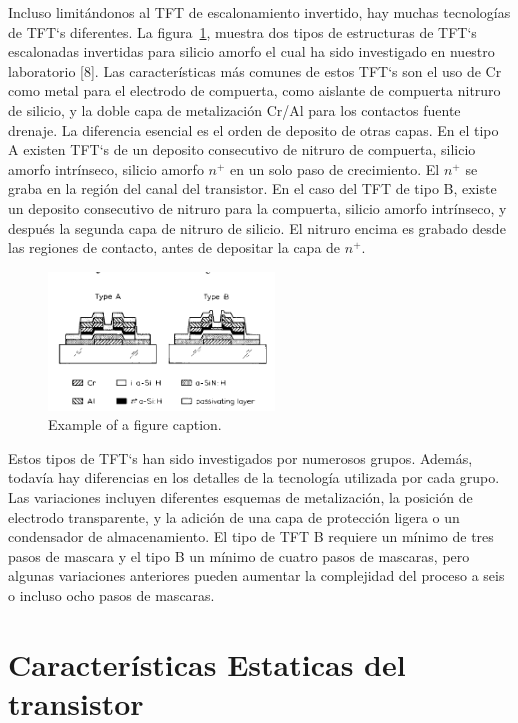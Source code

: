 \documentclass[conference]{IEEEtran}
\begin{document}
    Incluso limitándonos al TFT de escalonamiento invertido, hay muchas tecnologías 
    de TFT`s diferentes. La figura~\ref{fig2}, muestra dos tipos de estructuras de TFT`s
    escalonadas invertidas para silicio amorfo el cual ha sido investigado en nuestro
    laboratorio [8]. Las características más comunes de estos TFT`s son el uso de Cr como
    metal para el electrodo de compuerta, como aislante de compuerta nitruro de
    silicio, y la doble capa de metalización Cr/Al para los contactos fuente drenaje.
    La diferencia esencial es el orden de deposito de otras capas. En el tipo A
    existen TFT`s de un deposito consecutivo de nitruro de compuerta, silicio amorfo
    intrínseco, silicio amorfo $n^+$ en un solo paso de crecimiento. El $n^+$ se graba en
    la región del canal del transistor. En el caso del TFT de tipo B, existe un deposito
    consecutivo de nitruro para la compuerta, silicio amorfo intrínseco, y después
    la segunda capa de nitruro de silicio. El nitruro encima es grabado desde las
    regiones de contacto, antes de depositar la capa de $n^+$.

\begin{figure}[htbp]
    \centerline{\includegraphics[width=6.0cm]{img/imagen-2.png}}
    \caption{Example of a figure caption.}%
    \label{fig2}
\end{figure}

    Estos tipos de TFT`s han sido investigados por numerosos grupos. Además, todavía 
    hay diferencias en los detalles de la tecnología utilizada por cada grupo.
    Las variaciones incluyen diferentes esquemas de metalización, la posición de
    electrodo transparente, y la adición de una capa de protección ligera o un condensador
    de almacenamiento. El tipo de TFT B requiere un mínimo de tres
    pasos de mascara y el tipo B un mínimo de cuatro pasos de mascaras, pero
    algunas variaciones anteriores pueden aumentar la complejidad del proceso a
    seis o incluso ocho pasos de mascaras.

\section{Características Estaticas del transistor}
   
\end{document}
